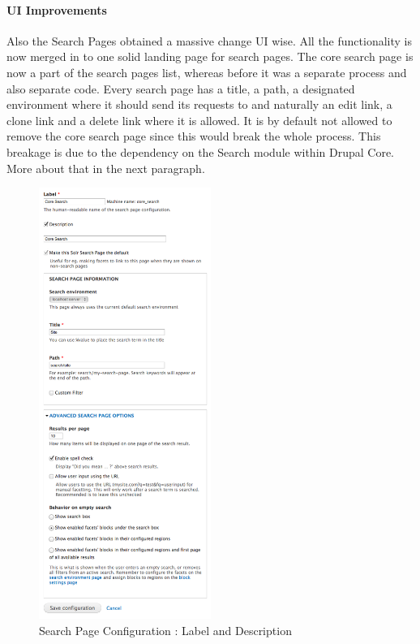 \paragraph{UI Improvements}Also the Search Pages obtained a massive change UI wise. All the functionality is now merged in to one solid landing page for search pages. The core search page is now a part of the search pages list, whereas before it was a separate process and also separate code. Every search page has a title, a path, a designated environment where it should send its requests to and naturally an edit link, a clone link and a delete link where it is allowed. It is by default not allowed to remove the core search page since this would break the whole process. 
This breakage is due to the dependency on the Search module within Drupal Core. More about that in the next paragraph. 

\begin{figure}
\begin{center}
     \includegraphics[width=0.5\textwidth]{images/implementation/search_page_detail.png}
     \caption{Search Page Configuration : Label and Description}
\end{center}
\end{figure}
